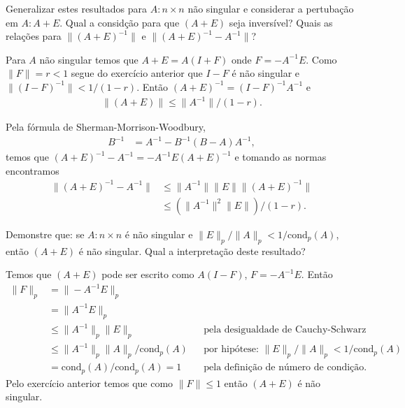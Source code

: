 \documentclass[a4paper,12pt, leqno, answers]{exam}
\begin{document}
\begin{questions}
     Generalizar estes resultados para $A : n \times n$ n\~{a}o singular e considerar a pertuba\c{c}\~{a}o em $A : A + E$. Qual a consid\c{c}\~{a}o para que $\left( A + E \right)$ seja invers\'{i}vel? Quais as rela\c{c}\~{o}es para $\| \left( A + E \right)^{-1} \|$ e $\| \left( A + E \right)^{-1} - A^{-1} \|$?
    \begin{solution}
        Para $A$ n\~{a}o singular temos que $A + E = A\left( I + F \right)$ onde $F = - A^{-1}E$. Como $\| F \| = r < 1$ segue do exerc\'{i}cio anterior que $I - F$ \'{e} n\~{a}o singular e $\| \left( I - F \right)^{-1} \| < 1 / \left( 1 - r \right)$. Ent\~{a}o $\left( A + E \right)^{-1} = \left( I - F \right)^{-1} A^{-1}$ e
        \begin{align*}
            \| \left( A + E \right) \| \leq \| A^{-1} \| / \left( 1 - r \right).
        \end{align*}

        Pela f\'{o}rmula de Sherman-Morrison-Woodbury,
        \begin{align*}
            B^{-1} &= A^{-1} - B^{-1} \left( B - A \right) A^{-1},
        \end{align*}
        temos que $\left( A + E \right)^{-1} - A^{-1} = - A^{-1} E \left( A + E \right)^{-1}$ e tomando as normas encontramos
        \begin{align*}
            \| \left( A + E \right)^{-1} - A^{-1} \| &\leq \| A^{-1} \| \| E \| \| \left( A + E \right)^{-1} \| \\
            &\leq \left( \| A^{-1} \|^2 \| E \| \right) / \left( 1 - r \right).
        \end{align*}
    \end{solution}

    \question Demonstre que: se $A : n \times n$ \'{e} n\~{a}o singular e $\| E \|_p / \| A \|_p < 1 / \text{cond}_p (A)$, ent\~{a}o $(A + E)$ \'{e} n\~{a}o singular. Qual a interpreta\c{c}\~{a}o deste resultado?
    \begin{solution}
        Temos que $\left( A + E \right)$ pode ser escrito como $A \left( I - F \right)$, $F = - A^{-1} E$. Ent\~{a}o
        \begin{align*}
            \| F \|_p &= \| - A^{-1} E \|_p \\
            &= \| A^{-1} E \|_p \\
            &\leq \| A^{-1} \|_p \| E \|_p && \text{pela desigualdade de Cauchy-Schwarz} \\
            &\leq \| A^{-1} \|_p \| A \|_p / \text{cond}_p (A) && \text{por hip\'{o}tese: $\| E \|_p / \| A \|_p < 1 / \text{cond}_p (A)$} \\
            &= \text{cond}_p (A) / \text{cond}_p (A) = 1 && \text{pela defini\c{c}\~{a}o de n\'{u}mero de condi\c{c}\~{a}o}.
        \end{align*}
        Pelo exerc\'{i}cio anterior temos que como $\| F \| \leq 1$ ent\~{a}o $\left( A + E \right)$ \'{e} n\~{a}o singular.


\end{solution}
\end{questions}
\end{document}
